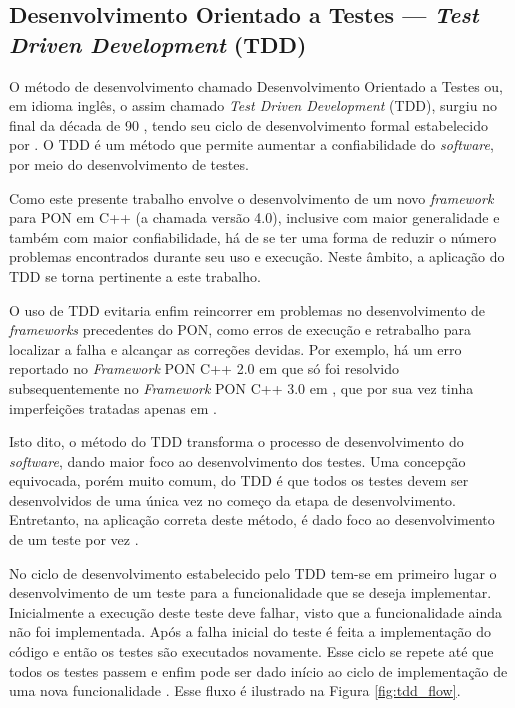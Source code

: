 \subsection{Desenvolvimento Orientado a Testes — \textit{Test Driven
    Development} (TDD)}\label{sec:tdd_intro}

O método de desenvolvimento chamado Desenvolvimento Orientado a Testes ou, em
idioma inglês, o assim chamado \textit{Test Driven Development} (TDD), surgiu no
final da década de 90 \cite{test_driven_2013}, tendo seu ciclo de
desenvolvimento formal estabelecido por . O TDD é um
método que permite aumentar a confiabilidade do \textit{software}, por meio do
desenvolvimento de testes.

Como este presente trabalho envolve o desenvolvimento de um novo \textit{framework}
para PON em C++ (a chamada versão 4.0), inclusive com maior generalidade e
também com maior confiabilidade, há de se ter uma forma de reduzir o número
problemas encontrados durante seu uso e execução. Neste âmbito, a aplicação do
TDD se torna pertinente a este trabalho.

O uso de TDD evitaria enfim reincorrer em problemas no desenvolvimento de
\textit{frameworks} precedentes do PON, como erros de execução e retrabalho para
localizar a falha e alcançar as correções devidas. Por exemplo, há um erro
reportado no \textit{Framework} PON C++ 2.0 em  que
só foi resolvido subsequentemente no \textit{Framework} PON C++ 3.0 em
, que por sua vez tinha imperfeições
tratadas apenas em .

Isto dito, o método do TDD transforma o processo de desenvolvimento do
\textit{software}, dando maior foco ao desenvolvimento dos testes. Uma concepção
equivocada, porém muito comum, do TDD é que todos os testes devem ser
desenvolvidos de uma única vez no começo da etapa de desenvolvimento.
Entretanto, na aplicação correta deste método, é dado foco ao desenvolvimento de
um teste por vez \cite{test_driven_2013}.

No ciclo de desenvolvimento estabelecido pelo TDD tem-se em primeiro lugar o
desenvolvimento de um teste para a funcionalidade que se deseja implementar.
Inicialmente a execução deste teste deve falhar, visto que a funcionalidade
ainda não foi implementada. Após a falha inicial do teste é feita a
implementação do código e então os testes são executados novamente. Esse ciclo
se repete até que todos os testes passem e enfim pode ser dado início ao ciclo
de implementação de uma nova funcionalidade \cite{ambler_2006}. Esse fluxo é
ilustrado na Figura \ref{fig:tdd_flow}.

